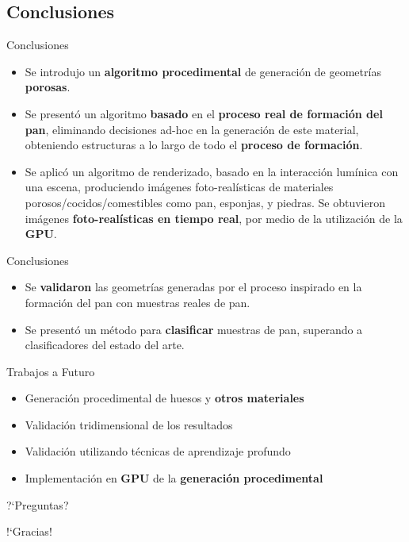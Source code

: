 \documentclass[spanish,unknownkeysallowed]{beamer}
\begin{document}
\subsection{Conclusiones}
\begin{frame}{Conclusiones}
\begin{block}{}
\begin{itemize}
\item Se introdujo un \textbf{algoritmo procedimental} de generación de geometrías \textbf{porosas}.
\item Se presentó un algoritmo \textbf{basado} en el \textbf{proceso real de formación del pan}, eliminando decisiones ad-hoc en la generación de este material, obteniendo estructuras a lo largo de todo el \textbf{proceso de formación}.
\item Se aplicó un algoritmo de renderizado, basado en la interacción lumínica con una escena, produciendo imágenes foto-realísticas de materiales porosos/cocidos/comestibles como pan, esponjas, y piedras. Se obtuvieron imágenes \textbf{foto-realísticas en tiempo real}, por medio de la utilización de la \textbf{GPU}.
\end{itemize}
\end{block}
\end{frame}

\begin{frame}{Conclusiones}
\begin{block}{}
\begin{itemize}
\item Se \textbf{validaron} las geometrías generadas por el proceso inspirado en la formación del pan con muestras reales de pan.
\item Se presentó un método para \textbf{clasificar} muestras de pan, superando a clasificadores del estado del arte.
\end{itemize}
\end{block}


\begin{block}{Trabajos a Futuro}
\begin{itemize}
\item Generación procedimental de huesos y \textbf{otros materiales}
\item Validación tridimensional de los resultados
\item Validación utilizando técnicas de aprendizaje profundo
\item Implementación en \textbf{GPU} de la \textbf{generación procedimental}
\end{itemize}
\end{block}
\end{frame}

\begin{frame}
\centering

?`Preguntas?

\end{frame}

\begin{frame}
\centering

!`Gracias!

\end{frame}
\end{document}
